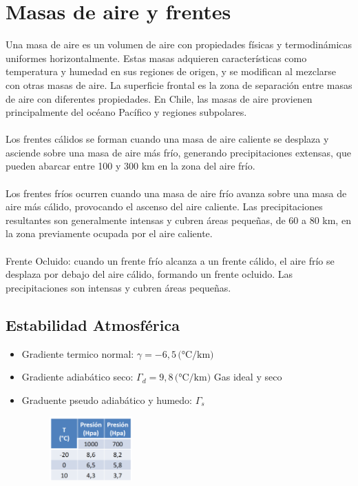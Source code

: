\section{Masas de aire y frentes}

Una masa de aire es un volumen de aire con propiedades físicas y termodinámicas uniformes horizontalmente. Estas masas adquieren características como temperatura y humedad en sus regiones de origen, y se modifican al mezclarse con otras masas de aire. La superficie frontal es la zona de separación entre masas de aire con diferentes propiedades. En Chile, las masas de aire provienen principalmente del océano Pacífico y regiones subpolares.
\\\\
Los frentes cálidos se forman cuando una masa de aire caliente se desplaza y asciende sobre una masa de aire más frío, generando precipitaciones extensas, que pueden abarcar entre 100 y 300 km en la zona del aire frío.
\\\\
Los frentes fríos ocurren cuando una masa de aire frío avanza sobre una masa de aire más cálido, provocando el ascenso del aire caliente. Las precipitaciones resultantes son generalmente intensas y cubren áreas pequeñas, de 60 a 80 km, en la zona previamente ocupada por el aire caliente.
\\\\
Frente Ocluido: cuando un frente frío alcanza a un frente cálido, el aire frío se desplaza por debajo del aire cálido, formando un frente ocluido. Las precipitaciones son intensas y cubren áreas pequeñas.

\subsection{Estabilidad Atmosférica}

\begin{itemize}
    \item Gradiente termico normal: $\gamma = -6,5 \, \text{(°C/km)}$
    \item Gradiente adiabático seco: $\Gamma_d = 9,8 \, \text{(°C/km)}$ Gas ideal y seco
    \item Graduente pseudo adiabático y humedo: $\Gamma_s$
    \begin{figure}[H]
        \centering
        \includegraphics[width=0.3\textwidth]{imagenes/grad.png}
        \label{fig:gradiente}
    \end{figure}
\end{itemize}

